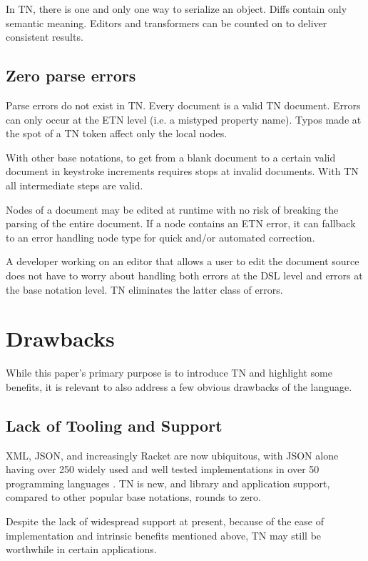 \documentclass[journal]{IEEEtran}
\begin{document}
In TN, there is one and only one way to serialize an object. Diffs contain only semantic meaning. Editors and transformers can be counted on to deliver consistent results.

\subsection{Zero parse errors}

Parse errors do not exist in TN. Every document is a valid TN document. Errors can only occur at the ETN level (i.e. a mistyped property name). Typos made at the spot of a TN token affect only the local nodes.

With other base notations, to get from a blank document to a certain valid document in keystroke increments requires stops at invalid documents. With TN all intermediate steps are valid.

Nodes of a document may be edited at runtime with no risk of breaking the parsing of the entire document. If a node contains an ETN error, it can fallback to an error handling node type for quick and/or automated correction.

A developer working on an editor that allows a user to edit the document source does not have to worry about handling both errors at the DSL level and errors at the base notation level. TN eliminates the latter class of errors.

\section{Drawbacks}

While this paper's primary purpose is to introduce TN and highlight some benefits, it is relevant to also address a few obvious drawbacks of the language.

\subsection{Lack of Tooling and Support}

XML, JSON, and increasingly Racket are now ubiquitous, with JSON alone having over 250 widely used and well tested implementations in over 50 programming languages \cite{JSON}. TN is new, and library and application support, compared to other popular base notations, rounds to zero.

Despite the lack of widespread support at present, because of the ease of implementation and intrinsic benefits mentioned above, TN may still be worthwhile in certain applications.
\end{document}
